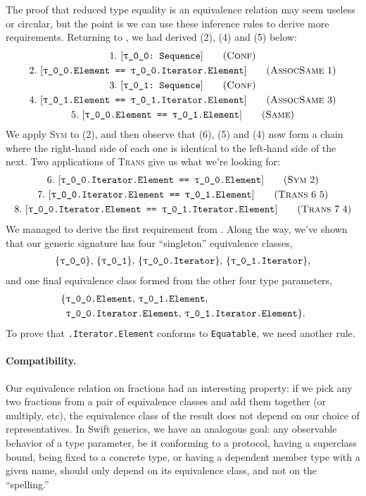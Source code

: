 \documentclass[../generics]{subfiles}
\begin{document}
\begin{example}\label{derived equiv example}
The proof that reduced type equality is an equivalence relation may seem useless or circular, but the point is we can use these inference rules to derive more requirements. Returning to , we had derived (2), (4) and (5) below:
\begin{gather*}
\ConfStep{\rT}{Sequence}{1}\\
\AssocSameStep{1}{\rT.Element}{\rT.Iterator.Element}{2}\\
\ConfStep{\rU}{Sequence}{3}\\
\AssocSameStep{3}{\rU.Element}{\rU.Iterator.Element}{4}\\
\SameStep{\rT.Element}{\rU.Element}{5}
\end{gather*}
We apply \textsc{Sym} to (2), and then observe that (6), (5) and (4) now form a chain where the right-hand side of each one is identical to the left-hand side of the next. Two applications of \textsc{Trans} give us what we're looking for:
\begin{gather*}
\SymStep{2}{\rT.Iterator.Element}{\rT.Element}{6}\\
\TransStep{6}{5}{\rT.Iterator.Element}{\rU.Element}{7}\\
\TransStep{7}{4}{\rT.Iterator.Element}{\rU.Iterator.Element}{8}
\end{gather*}
We managed to derive the first requirement from . Along the way, we've shown that our generic signature has four ``singleton'' equivalence classes,
\begin{gather*}
\{\texttt{\rT}\},\,
\{\texttt{\rU}\},\,
\{\texttt{\rT.Iterator}\},\,
\{\texttt{\rU.Iterator}\},
\end{gather*}
and one final equivalence class formed from the other four type parameters,
\begin{align*}
\{&\texttt{\rT.Element},\,\texttt{\rU.Element},\,\\
&\texttt{\rT.Iterator.Element},\,\texttt{\rU.Iterator.Element}\}.
\end{align*}
To prove that \texttt{\rT.Iterator.Element} conforms to \texttt{Equatable}, we need another rule.
\end{example}

\paragraph{Compatibility.}
Our equivalence relation on fractions had an interesting property: if we pick any two fractions from a pair of equivalence classes and add them together (or multiply, etc), the equivalence class of the result does not depend on our choice of representatives. In Swift generics, we have an analogous goal: any observable behavior of a type parameter, be it conforming to a protocol, having a superclass bound, being fixed to a concrete type, or having a dependent member type with a given name, should only depend on its equivalence class, and not on the ``spelling.''
\end{document}
